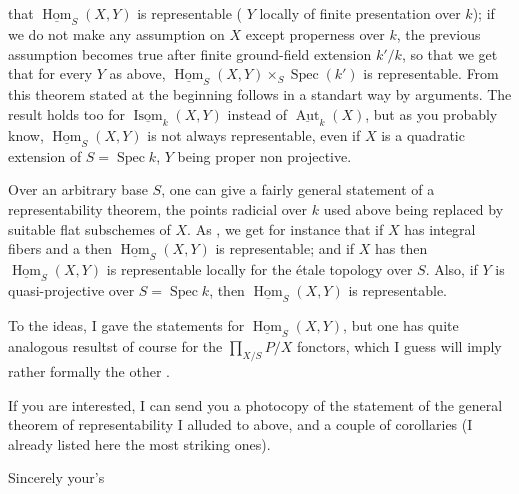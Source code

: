 that $\underline{\operatorname{Hom}}_S(X,Y)$ is representable ( $Y$ locally of finite presentation  over $k$); if we do not make any assumption on $X$ except properness over $k$, the previous assumption becomes true after finite ground-field extension $k'/k$, so that we get that for every $Y$ as above, $\underline{\operatorname{Hom}}_S(X,Y)\times_S\operatorname{Spec}(k')$ is representable. From this  theorem stated at the beginning follows in a standart way by  arguments. The result holds too for $\underline{\operatorname{Isom}}_k(X,Y)$ instead of $\underline{\operatorname{Aut}}_k(X)$, but as you probably know, $\underline{\operatorname{Hom}}_S(X,Y)$ is not always representable, even if $X$ is a quadratic extension of $S=\operatorname{Spec}k$, $Y$ being proper non projective.

Over an arbitrary base $S$, one can give a fairly general statement of a representability theorem, the points radicial over $k$ used above being replaced by suitable flat subschemes of $X$. As  , we get for instance that if $X$ has integral  fibers and a   then $\underline{\operatorname{Hom}}_S(X,Y)$ is representable; and if $X$ has  then $\underline{\operatorname{Hom}}_S(X,Y)$ is representable locally for the étale topology over $S$. Also, if $Y$ is quasi-projective over $S=\operatorname{Spec}k$, then $\underline{\operatorname{Hom}}_S(X,Y)$ is representable.

To  the ideas, I gave the statements for $\underline{\operatorname{Hom}}_S(X,Y)$, but one has quite analogous resultst of course for the $\prod_{X/S}P/X$ fonctors, which I guess will imply rather formally the other .

If you are interested, I can send you a photocopy of the statement of the general theorem of representability I alluded to\unsure{,} above, and a couple of corollaries (I already listed here the most striking ones).

Sincerely your's
